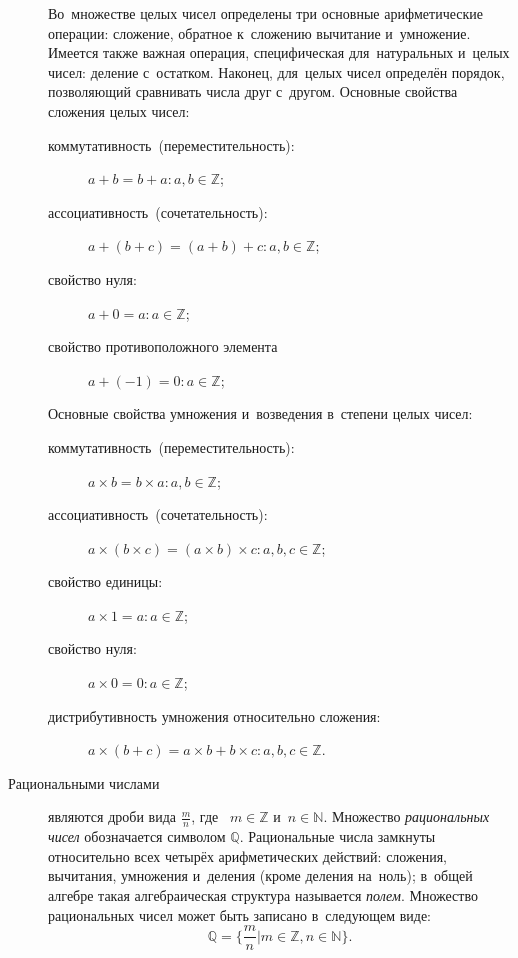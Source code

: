\documentclass[]{scrartcl}
\begin{document}
\begin{description}
	Во~множестве целых чисел определены три основные арифметические операции: сложение, обратное к~сложению вычитание и~умножение. Имеется также важная операция, специфическая для~натуральных и~целых чисел: деление с~остатком. Наконец, для~целых чисел определён порядок, позволяющий сравнивать числа друг с~другом. Основные свойства сложения целых чисел:
		\begin{description}
			\item[коммутативность~(переместительность):] ${\textstyle a+b=b+a: a,b \in \mathbb{Z}}$;
			\item[ассоциативность~(сочетательность):] ${\textstyle a+(b+c)=(a+b)+c: a,b \in \mathbb{Z}}$;
			\item[свойство нуля:] ${\textstyle a+0=a: a \in \mathbb{Z}}$;
			\item[свойство противоположного элемента] ${\textstyle a+(-1)=0: a \in \mathbb{Z}}$;
		\end{description} 
	Основные свойства умножения и~возведения в~степени целых чисел:
		\begin{description}
			\item[коммутативность~(переместительность):] ${\textstyle a \times b = b \times a: a,b \in \mathbb{Z}}$;
			\item[ассоциативность~(сочетательность):] ${\textstyle a \times (b \times c)=(a \times b) \times c: a,b,c \in \mathbb{Z}}$;
			\item[свойство единицы:] ${\textstyle a \times 1 = a: a \in \mathbb{Z}}$;
			\item[свойство нуля:] ${\textstyle a \times 0 = 0: a \in \mathbb{Z}}$;
			\item[дистрибутивность умножения относительно сложения:] ${\textstyle a \times (b+c)=a \times b + b \times c: a,b,c \in \mathbb{Z}}$.
		\end{description}
	\item[Рациональными числами] являются дроби вида $\frac{m}{n}$, где~ $m \in \mathbb{Z}$ и~$n \in \mathbb{N}$. Множество \emph{рациональных чисел} обозначается символом $\mathbb{Q}$. Рациональные числа замкнуты относительно всех четырёх арифметических действий: сложения, вычитания, умножения и~деления (кроме деления на~ноль); в~общей алгебре такая алгебраическая структура называется \emph{полем}. 
	Множество рациональных чисел может быть записано в~следующем виде:
	\begin{equation}\label{eq:rational-numbers-1}
	\mathbb{Q} = \{\frac{m}{n}|m \in \mathbb{Z}, n \in \mathbb{N}\}.
	\end{equation}

\end{description}
\end{document}
